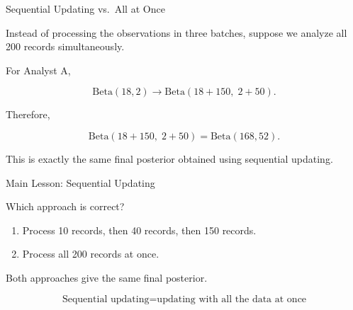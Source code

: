 \begin{frame}{Sequential Updating vs.\ All at Once}

Instead of processing the observations in three batches, suppose
we analyze all 200 records simultaneously.

\vspace{0.3cm}

For Analyst A,

\[
\mathrm{Beta}(18,2)
\longrightarrow
\mathrm{Beta}(18+150,\;2+50).
\]

Therefore,

\[
\mathrm{Beta}(18+150,\;2+50)
=
\mathrm{Beta}(168,52).
\]

\vspace{0.3cm}

This is exactly the same final posterior obtained using
sequential updating.

\end{frame}

\begin{frame}{Main Lesson: Sequential Updating}

Which approach is correct?

\begin{enumerate}
  \item Process 10 records, then 40 records, then 150 records.
  \item Process all 200 records at once.
\end{enumerate}

\pause

\vspace{0.3cm}

Both approaches give the same final posterior.

\vspace{0.3cm}

\[
\boxed{
\text{Sequential updating}
=
\text{updating with all the data at once}
}
\]

\end{frame}

